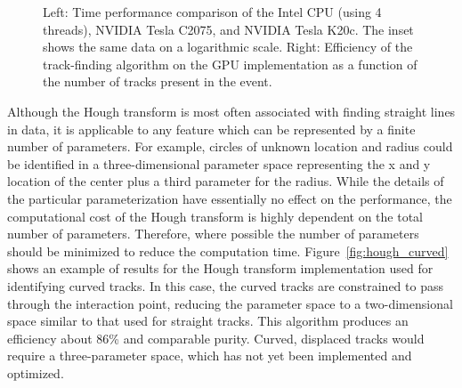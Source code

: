 \documentclass{JINST}
\begin{document}
\begin{figure}[!Hhtb]
\begin{center}
  \caption{Left: Time performance comparison of the Intel CPU (using 4 threads), NVIDIA Tesla C2075, and NVIDIA
    Tesla K20c. The inset shows the same data on a logarithmic scale. Right: Efficiency of the track-finding
    algorithm on the GPU implementation as a function of the number of tracks present in the
    event.}
\end{center}
\end{figure}

Although the Hough transform is most often associated with finding straight lines in data, it is applicable to any feature which can be represented 
by a finite number of parameters.  For example, circles of unknown location and radius could be identified in a three-dimensional parameter 
space representing the x and y location of the center plus a third parameter for the radius.  While the details of the particular parameterization
 have essentially no effect on the performance, the computational cost of the Hough transform is highly dependent on the total number of parameters.
Therefore, where possible the number of parameters should be minimized to reduce the computation time.  Figure~\ref{fig:hough_curved} shows
an example of results for the Hough transform implementation used for identifying curved tracks.  In this case, the
curved tracks are constrained to pass through the interaction point, reducing the parameter space to a two-dimensional space
similar to that used for straight tracks. This algorithm produces an efficiency about 86\% and comparable purity.  Curved, displaced tracks would require a
 three-parameter space, which has not yet been implemented and optimized.
\end{document}
